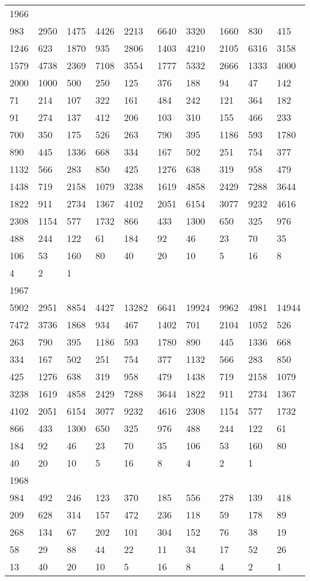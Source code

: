 \begin{longtable}{*{10}{l}}
1966&&&&&&&&&\\
983& 2950& 1475& 4426& 2213& 6640& 3320& 1660& 830& 415\\
1246& 623& 1870& 935& 2806& 1403& 4210& 2105& 6316& 3158\\
1579& 4738& 2369& 7108& 3554& 1777& 5332& 2666& 1333& 4000\\
2000& 1000& 500& 250& 125& 376& 188& 94& 47& 142\\
71& 214& 107& 322& 161& 484& 242& 121& 364& 182\\
91& 274& 137& 412& 206& 103& 310& 155& 466& 233\\
700& 350& 175& 526& 263& 790& 395& 1186& 593& 1780\\
890& 445& 1336& 668& 334& 167& 502& 251& 754& 377\\
1132& 566& 283& 850& 425& 1276& 638& 319& 958& 479\\
1438& 719& 2158& 1079& 3238& 1619& 4858& 2429& 7288& 3644\\
1822& 911& 2734& 1367& 4102& 2051& 6154& 3077& 9232& 4616\\
2308& 1154& 577& 1732& 866& 433& 1300& 650& 325& 976\\
488& 244& 122& 61& 184& 92& 46& 23& 70& 35\\
106& 53& 160& 80& 40& 20& 10& 5& 16& 8\\
4& 2& 1& \\

1967&&&&&&&&&\\
5902& 2951& 8854& 4427& 13282& 6641& 19924& 9962& 4981& 14944\\
7472& 3736& 1868& 934& 467& 1402& 701& 2104& 1052& 526\\
263& 790& 395& 1186& 593& 1780& 890& 445& 1336& 668\\
334& 167& 502& 251& 754& 377& 1132& 566& 283& 850\\
425& 1276& 638& 319& 958& 479& 1438& 719& 2158& 1079\\
3238& 1619& 4858& 2429& 7288& 3644& 1822& 911& 2734& 1367\\
4102& 2051& 6154& 3077& 9232& 4616& 2308& 1154& 577& 1732\\
866& 433& 1300& 650& 325& 976& 488& 244& 122& 61\\
184& 92& 46& 23& 70& 35& 106& 53& 160& 80\\
40& 20& 10& 5& 16& 8& 4& 2& 1& \\

1968&&&&&&&&&\\
984& 492& 246& 123& 370& 185& 556& 278& 139& 418\\
209& 628& 314& 157& 472& 236& 118& 59& 178& 89\\
268& 134& 67& 202& 101& 304& 152& 76& 38& 19\\
58& 29& 88& 44& 22& 11& 34& 17& 52& 26\\
13& 40& 20& 10& 5& 16& 8& 4& 2& 1\\


\end{longtable}
